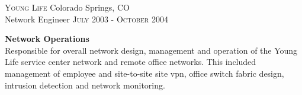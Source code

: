 
\textsc{Young Life} \hfill Colorado Springs, CO\\
Network Engineer \hfill \textsc{July 2003} - \textsc{October 2004}

\textbf{Network Operations}\\
Responsible for overall network design, management and operation of the Young
Life service center network and remote office networks. This included management
of employee and site-to-site site vpn, office switch fabric design, intrusion
detection and network monitoring.  
